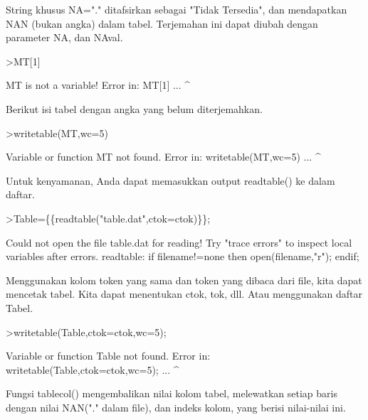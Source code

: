 \documentclass{article}
\begin{document}
\begin{eulernotebook}
\begin{eulercomment}
\begin{eulercomment}
\begin{eulercomment}
String khusus NA="." ditafsirkan sebagai "Tidak Tersedia", dan
mendapatkan NAN (bukan angka) dalam tabel. Terjemahan ini dapat diubah
dengan parameter NA, dan NAval.
\end{eulercomment}
\begin{eulerprompt}
>MT[1]
\end{eulerprompt}
\begin{euleroutput}
  MT is not a variable!
  Error in:
  MT[1] ...
       ^
\end{euleroutput}
\begin{eulercomment}
Berikut isi tabel dengan angka yang belum diterjemahkan.
\end{eulercomment}
\begin{eulerprompt}
>writetable(MT,wc=5)
\end{eulerprompt}
\begin{euleroutput}
  Variable or function MT not found.
  Error in:
  writetable(MT,wc=5) ...
               ^
\end{euleroutput}
\begin{eulercomment}
Untuk kenyamanan, Anda dapat memasukkan output readtable() ke dalam
daftar.
\end{eulercomment}
\begin{eulerprompt}
>Table=\{\{readtable("table.dat",ctok=ctok)\}\};
\end{eulerprompt}
\begin{euleroutput}
  Could not open the file
  table.dat
  for reading!
  Try "trace errors" to inspect local variables after errors.
  readtable:
      if filename!=none then open(filename,"r"); endif;
\end{euleroutput}
\begin{eulercomment}
Menggunakan kolom token yang sama dan token yang dibaca dari file,
kita dapat mencetak tabel. Kita dapat menentukan ctok, tok, dll. Atau
menggunakan daftar Tabel.
\end{eulercomment}
\begin{eulerprompt}
>writetable(Table,ctok=ctok,wc=5);
\end{eulerprompt}
\begin{euleroutput}
  Variable or function Table not found.
  Error in:
  writetable(Table,ctok=ctok,wc=5); ...
                  ^
\end{euleroutput}
\begin{eulercomment}
Fungsi tablecol() mengembalikan nilai kolom tabel, melewatkan setiap
baris dengan nilai NAN("." dalam file), dan indeks kolom, yang berisi
nilai-nilai ini.
\end{eulercomment}

\end{eulercomment}
\end{eulercomment}
\end{eulernotebook}
\end{document}
